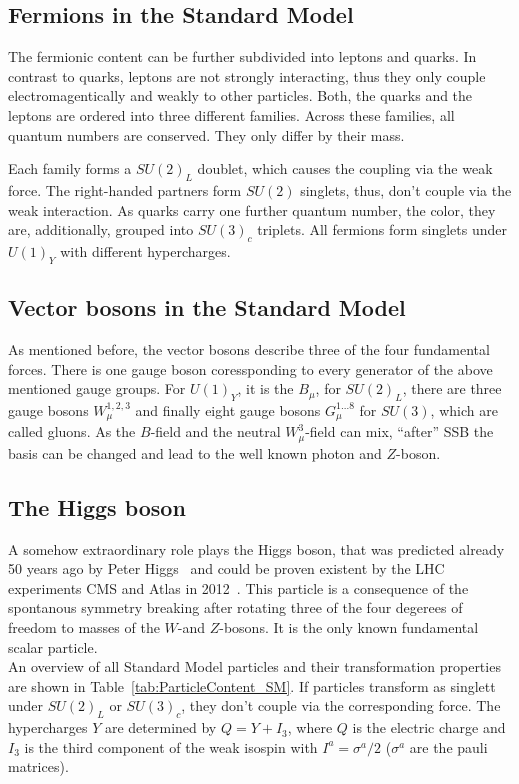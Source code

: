 \subsection*{Fermions in the Standard Model}
The fermionic content can be further subdivided into leptons and quarks.
In contrast to quarks, leptons are not strongly interacting, thus they only couple electromagentically and weakly to other particles.
Both, the quarks and the leptons are ordered into three different families.
Across these families, all quantum numbers are conserved.
They only differ by their mass.

Each family forms a $SU(2)_L$ doublet, which causes the coupling via the weak force.
The right-handed partners form $SU(2)$ singlets, thus, don't couple via the weak interaction.
As quarks carry one further quantum number, the color, they are, additionally, grouped into $SU(3)_c$ triplets.
All fermions form singlets under $U(1)_Y$ with different hypercharges.

\subsection*{Vector bosons in the Standard Model}
As mentioned before, the vector bosons describe three of the four fundamental forces.
There is one gauge boson coressponding to every generator of the above mentioned gauge groups.
For $U(1)_Y$, it is the $B_{\mu}$, for $SU(2)_L$, there are three gauge bosons $W_{\mu}^{1,2,3}$ and finally eight gauge bosons $G_{\mu}^{1...8}$ for $SU(3)$, which are called gluons.
As the $B$-field and the neutral $W^3_{\mu}$-field can mix, ``after'' SSB the basis can be changed and lead to the well known photon and $Z$-boson.

\subsection*{The Higgs boson}
A somehow extraordinary role plays the Higgs boson, that was predicted already 50 years ago by Peter Higgs~\cite{bib:Higgs_Prediction,bib:Higgs_Prediction_2} and could be proven existent by the LHC experiments CMS and Atlas in 2012~\cite{bib:Theory:CMS:HiggsObservation,bib:Theory:Atlas:HiggsObservation}.
This particle is a consequence of the spontanous symmetry breaking after rotating three of the four degerees of freedom to masses of the $W$-and $Z$-bosons.
It is the only known fundamental scalar particle.\\


An overview of all Standard Model particles and their transformation properties are shown in Table~\ref{tab:ParticleContent_SM}.
If particles transform as singlett under $SU(2)_L$ or $SU(3)_c$, they don't couple via the corresponding force.
The hypercharges $Y$ are determined by $Q=Y+I_3$, where $Q$ is the electric charge and $I_3$ is the third component of the weak isospin with $I^a = \sigma^a/2$ ($\sigma^a$ are the pauli matrices). 

